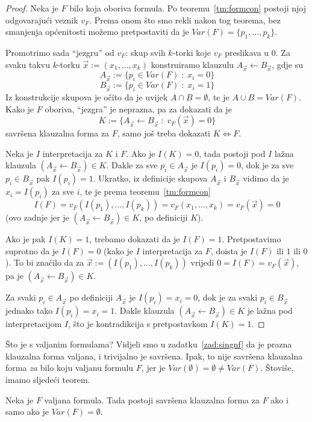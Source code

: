 \begin{proof}
Neka je $F$ bilo koja oboriva formula. Po teoremu~\ref{tm:formcon} postoji njoj odgovarajući veznik $v_F$. Prema onom što smo rekli nakon tog teorema, bez smanjenja općenitosti možemo pretpostaviti da je $Var(F)=\{p_1,\ldots,p_k\}$.

Promotrimo sada ``jezgru'' od $v_F$: skup svih $k$-torki koje $v_F$ preslikava u $0$. Za svaku takvu $k$-torku $\vec x:=(x_1,\ldots,x_k)$ konstruiramo klauzulu $A_{\vec x}\leftarrow B_{\vec x}$, gdje su
$$A_{\vec x}:=\{p_i\in Var(F)\;:\;x_i=0\}$$
$$B_{\vec x}:=\{p_i\in Var(F)\;:\;x_i=1\}$$
Iz konstrukcije skupova je očito da je uvijek $A\cap B=\emptyset$, te je $A\cup B=Var(F)$. Kako je $F$ oboriva, ``jezgra'' je neprazna, pa za dokazati da je
$$K:=\{A_{\vec x}\leftarrow B_{\vec x}\;:\;v_F(\vec x)=0\}$$
savršena klauzalna forma za $F$, samo još treba dokazati $K\Leftrightarrow F$.

Neka je $I$ interpretacija za $K$ i $F$. Ako je $I(K)=0$, tada postoji pod $I$ lažna klauzula $(A_{\vec x}\leftarrow B_{\vec x})\in K$. Dakle za sve $p_i\in A_{\vec x}$ je $I(p_i)=0$, dok je za sve $p_i\in B_{\vec x}$ pak $I(p_i)=1$. Ukratko, iz definicije skupova $A_{\vec x}$ i $B_{\vec x}$ vidimo da je $x_i=I(p_i)$ za sve $i$, te je prema teoremu~\ref{tm:formcon}
$$I(F)=v_F(I(p_1),\ldots,I(p_k))=v_F(x_1,\ldots,x_k)=v_F(\vec x)=0$$
(ovo zadnje jer je $(A_{\vec x}\leftarrow B_{\vec x})\in K$, po definiciji $K$).

Ako je pak $I(K)=1$, trebamo dokazati da je $I(F)=1$. Pretpostavimo suprotno da je $I(F)=0$ (kako je $I$ interpretacija za $F$, doista je $I(F)$ ili $1$ ili $0$). To bi značilo da za $\vec x:=(I(p_1),\ldots,I(p_k))$ vrijedi $0=I(F)=v_F(\vec x)$, pa je $(A_{\vec x}\leftarrow B_{\vec x})\in K$.

Za svaki $p_i\in A_{\vec x}$ po definiciji $A_{\vec x}$ je $I(p_i)=x_i=0$, dok je za svaki $p_i\in B_{\vec x}$ jednako tako $I(p_i)=x_i=1$. Dakle klauzula $(A_{\vec x}\leftarrow B_{\vec x})\in K$ je lažna pod interpretacijom $I$, što je kontradikcija s pretpostavkom $I(K)=1$.
\end{proof}

Što je s valjanim formulama? Vidjeli smo u zadatku~\ref{zad:singnf} da je prazna klauzalna forma valjana, i trivijalno je savršena. Ipak, to nije savršena klauzalna forma \emph{za} bilo koju valjanu formulu $F$, jer je $Var(\emptyset)=\emptyset\not=Var(F)$. Štoviše, imamo sljedeći teorem.

\begin{teorem}
Neka je $F$ valjana formula. Tada postoji savršena klauzalna forma za $F$ ako i samo ako je $Var(F)=\emptyset$.
\end{teorem}

